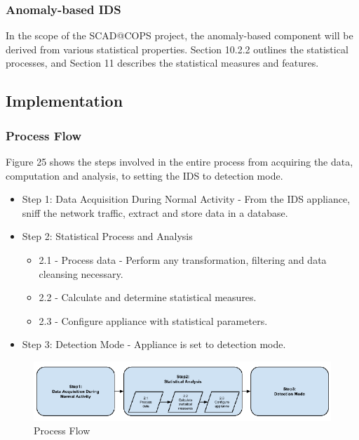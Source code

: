 \documentclass[11pt,]{article}
\begin{document}
\subsubsection{Anomaly-based IDS}\label{anomaly-based-ids}

In the scope of the SCAD@COPS project, the anomaly-based component will
be derived from various statistical properties. Section 10.2.2 outlines
the statistical processes, and Section 11 describes the statistical
measures and features.

\subsection{Implementation}\label{implementation}

\subsubsection{Process Flow}\label{process-flow}

Figure 25 shows the steps involved in the entire process from acquiring
the data, computation and analysis, to setting the IDS to detection
mode.

\begin{itemize}
\itemsep1pt\parskip0pt
\item
  Step 1: Data Acquisition During Normal Activity - From the IDS
  appliance, sniff the network traffic, extract and store data in a
  database.
\item
  Step 2: Statistical Process and Analysis

  \begin{itemize}
  \itemsep1pt\parskip0pt
  \item
    2.1 - Process data - Perform any transformation, filtering and data
    cleansing necessary.
  \item
    2.2 - Calculate and determine statistical measures.
  \item
    2.3 - Configure appliance with statistical parameters.
  \end{itemize}
\item
  Step 3: Detection Mode - Appliance is set to detection mode.
\end{itemize}

\begin{figure}[bottom]

{\centering \includegraphics{thesis_files/figure-latex/unnamed-chunk-36-1} 

}

\caption{Process Flow}\label{fig:unnamed-chunk-36}
\end{figure}
\end{document}
